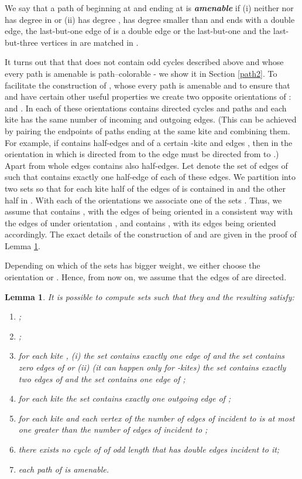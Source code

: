\documentclass[a4, 11pt]{article}
\newcommand{\<}{\langle}
\renewcommand{\>}{\rangle}
\newtheorem{lemma}{Lemma}
\begin{document}
We say that a path  of  beginning at  and ending at    is {\bf \em amenable} if (i) neither  nor  has degree  in 
or (ii)  has degree ,  has degree smaller than  and  ends with a double edge, the last-but-one edge of  is a double edge or the last-but-one and the last-but-three vertices in  are matched in .

It turns out that  that does not contain odd cycles described above and whose every path is amenable is path--colorable - we show it in
 Section \ref{path2}. To facilitate the construction of , whose every path is amenable and to ensure that  and  have certain other useful properties we create  two opposite orientations of :  and . In each of these orientations  contains directed cycles and paths and each kite has the same number of incoming and outgoing edges. (This can be achieved by pairing the endpoints of paths ending at the same kite and combining them. For example, if   contains half-edges  and  of a certain -kite  and edges , then in the orientation  in which  is directed from   to  the edge  must be directed from  to .)  Apart from whole edges  contains also half-edges. Let  denote the set of edges of  such that  contains exactly
one half-edge of each of these edges. We partition  into two sets  so that for each kite  half of the edges of 
is contained in  and the other half in .
With each of the orientations  we associate
one of the sets . Thus,  we assume that  contains , with the edges of  being oriented in a consistent way with the edges of  under orientation , and  contains ,  with its edges being oriented accordingly.
The exact details of the construction of  and  are given in the proof of Lemma \ref{F12}.



Depending on which of the sets  has bigger weight,  we either choose the orientation  or .  Hence, from now on, we assume that the edges of  are directed.

\begin{lemma}\label{F12}
It is possible to compute sets     such that they and  the resulting  satisfy:
\begin{enumerate}
\item ;
\item ;
\item for each kite , (i) the set  contains exactly one edge of  and the set  contains zero edges of  or (ii) (it can happen only for -kites) the set  contains exactly two edges of  and the set  contains one edge of ;
\item for each kite  the set  contains exactly one outgoing edge of ;
\item for each kite  and each vertex  of  the number of edges of  incident to  is at most one greater than the number of edges of  incident to ;
\item there exists no cycle of  of odd length  that has  double edges incident to it;
\item each path of  is amenable.

\end{enumerate}
\end{lemma}
\end{document}
